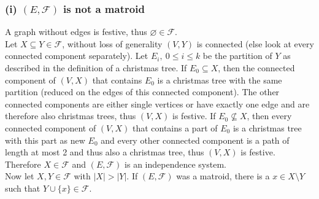 \documentclass{article}
\let\emptyset\varnothing
\begin{document}
  \subsubsection*{(i) $(E, \mathcal{F})$ is not a matroid}
  A graph without edges is festive, thus $\emptyset \in \mathcal F$.\\
  Let $X\subseteq Y \in \mathcal F$, without loss of generality $(V,Y)$ is connected (else look at every connected component separately). Let $E_i, ~ 0\leq i\leq k$ be the partition of $Y$ as described in the definition of a christmas tree. If $E_0\subseteq X$, then the connected component of $(V,X)$ that contains $E_0$ is a christmas tree with the same partition (reduced on the edges of this connected component). The other connected components are either single vertices or have exactly one edge and are therefore also christmas trees, thus $(V,X)$ is festive. If $E_0\nsubseteq X$, then every connected component of $(V,X)$ that contains a part of $E_0$ is a christmas tree with this part as new $E_0$ and every other connected component is a path of length at most 2 and thus also a christmas tree, thus $(V,X)$ is festive. Therefore $X\in \mathcal F$ and $(E,\mathcal F)$ is an independence system.\\
  Now let $X,Y\in \mathcal F$ with $|X|>|Y|$. If $(E,\mathcal F)$ was a matroid, there is a $x\in X\setminus Y$ such that $Y\cup \{x\}\in \mathcal F$.
\end{document}
